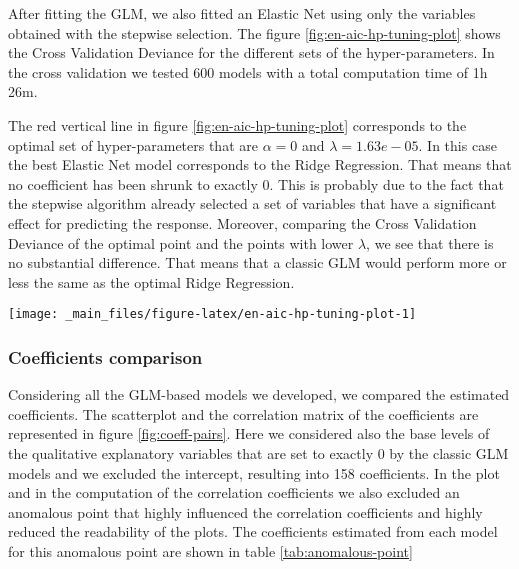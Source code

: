 \documentclass[a4paper, twoside, openright, 12pt]{report}
\let\origfigure\figure
\let\endorigfigure\endfigure
\renewenvironment{figure}[1][2] {
  \expandafter\origfigure\expandafter[!hbtp]
} {
  \endorigfigure
}
\theoremstyle{definition}
\theoremstyle{definition}
\theoremstyle{definition}
\theoremstyle{remark}
\begin{document}
After fitting the GLM, we also fitted an Elastic Net using only the variables obtained with the stepwise selection. The figure \ref{fig:en-aic-hp-tuning-plot} shows the Cross Validation Deviance for the different sets of the hyper-parameters. In the cross validation we tested 600 models with a total computation time of 1h 26m.

The red vertical line in figure \ref{fig:en-aic-hp-tuning-plot} corresponds to the optimal set of hyper-parameters that are \(\alpha = 0\) and
\(\lambda = 1.63e-05\). In this case the best Elastic Net model corresponds to the Ridge Regression. That means that no coefficient has been shrunk to exactly 0. This is probably due to the fact that the stepwise algorithm already selected a set of variables that have a significant effect for predicting the response. Moreover, comparing the Cross Validation Deviance of the optimal point and the points with lower \(\lambda\), we see that there is no substantial difference. That means that a classic GLM would perform more or less the same as the optimal Ridge Regression.





\begin{figure}[!hbtp]

{\centering \texttt{[image: \_main\_files/figure-latex/en-aic-hp-tuning-plot-1]} 

}

\caption[Elastic Net AIC hyper-parameter tuning.]{Elastic Net AIC hyper-parameter tuning.}\label{fig:en-aic-hp-tuning-plot}
\end{figure}

\hypertarget{coefficients-comparison}{%
\subsubsection{Coefficients comparison}\label{coefficients-comparison}}

Considering all the GLM-based models we developed, we compared the estimated coefficients. The scatterplot and the correlation matrix of the coefficients are represented in figure \ref{fig:coeff-pairs}. Here we considered also the base levels of the qualitative explanatory variables that are set to exactly 0 by the classic GLM models and we excluded the intercept, resulting into 158 coefficients. In the plot and in the computation of the correlation coefficients we also excluded an anomalous point that highly influenced the correlation coefficients and highly reduced the readability of the plots. The coefficients estimated from each model for this anomalous point are shown in table \ref{tab:anomalous-point}
\end{document}

